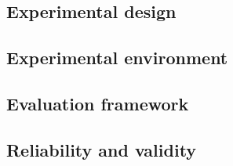\subsection{Experimental design}
\label{subsec:experimental_design}



\subsection{Experimental environment}
\label{subsec:experimental_env}



\subsection{Evaluation framework}
\label{subsec:method_eval_framework}


\subsection{Reliability and validity}
\label{subsec:method_reliability_validity}